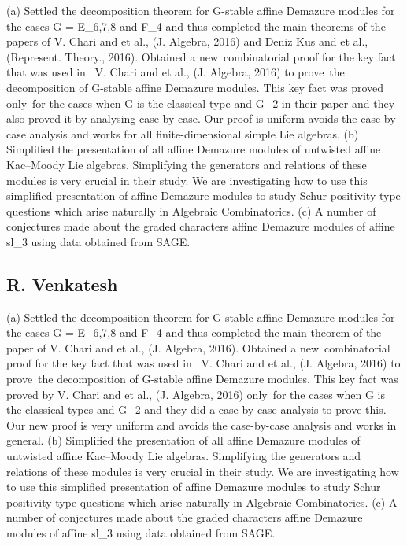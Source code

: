 (a) Settled the decomposition theorem for G-stable affine Demazure modules for the cases G = E_6,7,8 and F_4 and thus completed the main theorems of the papers of V. Chari and et al., (J. Algebra, 2016) and Deniz Kus and et al., (Represent. Theory., 2016). Obtained a new combinatorial proof for the key fact that was used in  V. Chari and et al., (J. Algebra, 2016) to prove the decomposition of G-stable affine Demazure modules. This key fact was proved only for the cases when G is the classical type and G_2 in their paper and they also proved it by analysing case-by-case. Our proof is uniform avoids the case-by-case analysis and works for all finite-dimensional simple Lie algebras.  (b) Simplified the presentation of all affine Demazure modules of untwisted affine Kac–Moody Lie algebras. Simplifying the generators and relations of these modules is very crucial in their study. We are investigating how to use this simplified presentation of affine Demazure modules to study Schur positivity type questions which arise naturally in Algebraic Combinatorics.   (c) A number of conjectures made about the graded characters affine Demazure modules of affine sl_3 using data obtained from SAGE. 


\subsection{R. Venkatesh}

(a) Settled the decomposition theorem for G-stable affine Demazure modules for the cases G = E_6,7,8 and F_4 and thus completed the main theorem of the paper of V. Chari and et al., (J. Algebra, 2016). Obtained a new combinatorial proof for the key fact that was used in  V. Chari and et al., (J. Algebra, 2016) to prove the decomposition of G-stable affine Demazure modules. This key fact was proved by V. Chari and et al., (J. Algebra, 2016) only for the cases when G is the classical types and G_2 and they did a case-by-case analysis to prove this. Our new proof is very uniform and avoids the case-by-case analysis and works in general.  (b) Simplified the presentation of all affine Demazure modules of untwisted affine Kac–Moody Lie algebras. Simplifying the generators and relations of these modules is very crucial in their study. We are investigating how to use this simplified presentation of affine Demazure modules to study Schur positivity type questions which arise naturally in Algebraic Combinatorics.   (c) A number of conjectures made about the graded characters affine Demazure modules of affine sl_3 using data obtained from SAGE. 


